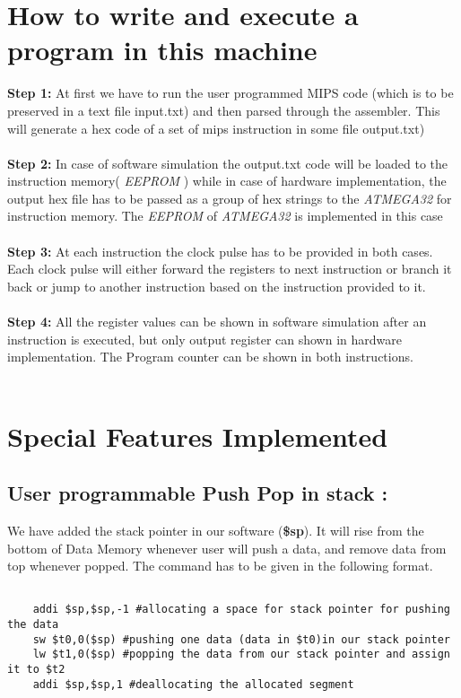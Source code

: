 \documentclass[12pt]{article}
\begin{document}
\section{How to write and execute a program in this machine}
    \textbf{Step 1: } At first we have to run the user programmed MIPS code (which is to be preserved in a text file input.txt) and then parsed through the assembler. This will generate a hex code of a set of mips instruction in some file output.txt) \\ \\
    \textbf{Step 2: } In case of software simulation the output.txt code will be loaded to the instruction memory( \textit{EEPROM} ) while in case of hardware implementation, the output hex file has to be passed as a group of hex strings to the \textit{ATMEGA32} for instruction memory. The \textit{EEPROM} of \textit{ATMEGA32} is implemented in this case\\ \\
    \textbf{Step 3: } At each instruction the clock pulse has to be provided in both cases. Each clock pulse will either forward the registers to next instruction or branch it back or jump to another instruction based on the instruction provided to it.\\ \\
    \textbf{Step 4: } All the register values can be shown in software simulation after an instruction is executed, but only output register can shown in hardware implementation.
    The Program counter can be shown in both instructions.\\ \\ 
    
\section{Special Features Implemented}

\subsection{User programmable Push Pop in stack : }

We have added the stack pointer in our software (\textbf{\$sp}). It will rise from the bottom of Data Memory whenever user will push a data, and remove data from top whenever popped. The command has to be given in the following format.

\begin{verbatim}

    addi $sp,$sp,-1 #allocating a space for stack pointer for pushing the data
    sw $t0,0($sp) #pushing one data (data in $t0)in our stack pointer
    lw $t1,0($sp) #popping the data from our stack pointer and assign it to $t2
    addi $sp,$sp,1 #deallocating the allocated segment
    
\end{verbatim}
\end{document}
